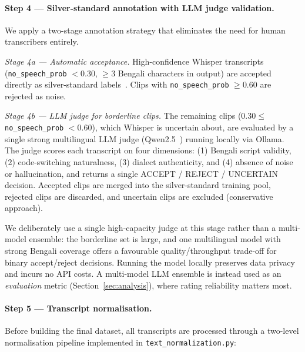 \paragraph{Step 4 --- Silver-standard annotation with LLM judge validation.}
We apply a two-stage annotation strategy that eliminates the need for human
transcribers entirely.

\textit{Stage 4a --- Automatic acceptance.}
High-confidence Whisper transcripts (\texttt{no\_speech\_prob} $< 0.30$,
$\geq 3$ Bengali characters in output) are accepted directly as silver-standard
labels~\citep{gandhi2023whisper}.
Clips with \texttt{no\_speech\_prob} $\geq 0.60$ are rejected as noise.

\textit{Stage 4b --- LLM judge for borderline clips.}
The remaining clips ($0.30 \leq$ \texttt{no\_speech\_prob} $< 0.60$),
which Whisper is uncertain about, are evaluated by a single strong
multilingual LLM judge (Qwen2.5~\citep{qwen2025}) running locally via Ollama.
The judge scores each transcript on four dimensions:
(1) Bengali script validity,
(2) code-switching naturalness,
(3) dialect authenticity, and
(4) absence of noise or hallucination,
and returns a single ACCEPT / REJECT / UNCERTAIN decision.
Accepted clips are merged into the silver-standard training pool, rejected
clips are discarded, and uncertain clips are excluded (conservative approach).

We deliberately use a single high-capacity judge at this stage rather than a
multi-model ensemble: the borderline set is large, and one multilingual model
with strong Bengali coverage offers a favourable quality/throughput trade-off
for binary accept/reject decisions. Running the model locally preserves data
privacy and incurs no API costs. A multi-model LLM ensemble is instead used as
an \emph{evaluation} metric (Section~\ref{sec:analysis}), where rating
reliability matters most.

\paragraph{Step 5 --- Transcript normalisation.}
Before building the final dataset, all transcripts are processed through a
two-level normalisation pipeline implemented in \texttt{text\_normalization.py}:

